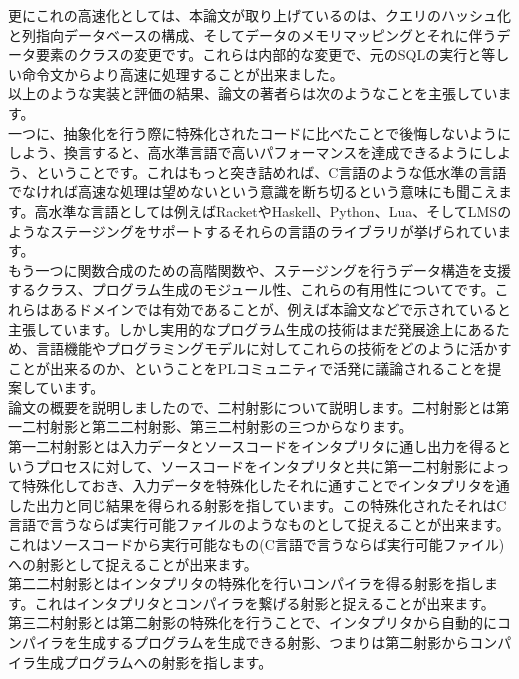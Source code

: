 \documentclass[a4paper, dvipdfmx, 12pt]{article}
\begin{document}
更にこれの高速化としては、本論文が取り上げているのは、クエリのハッシュ化と列指向データベースの構成、そしてデータのメモリマッピングとそれに伴うデータ要素のクラスの変更です。これらは内部的な変更で、元のSQLの実行と等しい命令文からより高速に処理することが出来ました。\\

以上のような実装と評価の結果、論文の著者らは次のようなことを主張しています。\\

一つに、抽象化を行う際に特殊化されたコードに比べたことで後悔しないようにしよう、換言すると、高水準言語で高いパフォーマンスを達成できるようにしよう、ということです。これはもっと突き詰めれば、C言語のような低水準の言語でなければ高速な処理は望めないという意識を断ち切るという意味にも聞こえます。高水準な言語としては例えばRacketやHaskell、Python、Lua、そしてLMSのようなステージングをサポートするそれらの言語のライブラリが挙げられています。\\

もう一つに関数合成のための高階関数や、ステージングを行うデータ構造を支援するクラス、プログラム生成のモジュール性、これらの有用性についてです。これらはあるドメインでは有効であることが、例えば本論文などで示されていると主張しています。しかし実用的なプログラム生成の技術はまだ発展途上にあるため、言語機能やプログラミングモデルに対してこれらの技術をどのように活かすことが出来るのか、ということをPLコミュニティで活発に議論されることを提案しています。\\

論文の概要を説明しましたので、二村射影について説明します。二村射影とは第一二村射影と第二二村射影、第三二村射影の三つからなります。\\

第一二村射影とは入力データとソースコードをインタプリタに通し出力を得るというプロセスに対して、ソースコードをインタプリタと共に第一二村射影によって特殊化しておき、入力データを特殊化したそれに通すことでインタプリタを通した出力と同じ結果を得られる射影を指しています。この特殊化されたそれはC言語で言うならば実行可能ファイルのようなものとして捉えることが出来ます。これはソースコードから実行可能なもの(C言語で言うならば実行可能ファイル)への射影として捉えることが出来ます。\\

第二二村射影とはインタプリタの特殊化を行いコンパイラを得る射影を指します。これはインタプリタとコンパイラを繋げる射影と捉えることが出来ます。\\

第三二村射影とは第二射影の特殊化を行うことで、インタプリタから自動的にコンパイラを生成するプログラムを生成できる射影、つまりは第二射影からコンパイラ生成プログラムへの射影を指します。\\
\end{document}
